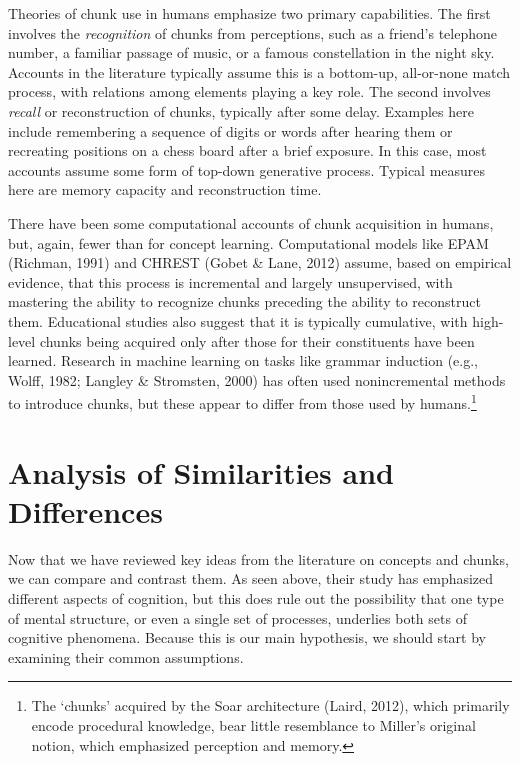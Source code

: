 \documentclass[11pt,letterpaper]{article}
\begin{document}
Theories of chunk use in humans emphasize two primary capabilities. 
The first involves the {\it recognition\/} of chunks from perceptions, 
  such as a friend's telephone number, a familiar passage of music,
  or a famous constellation in the night sky. 
Accounts in the literature typically assume this is a bottom-up,
  all-or-none match process, with relations among elements playing 
  a key role. 
The second involves {\it recall\/} or reconstruction of chunks, typically 
  after some delay. 
Examples here include remembering a sequence of digits or words after 
  hearing them or recreating positions on a chess board after a brief 
  exposure. 
In this case, most accounts assume some form of top-down generative
  process. 
Typical measures here are memory capacity and reconstruction time. 




There have been some computational accounts of chunk acquisition
  in humans, but, again, fewer than for concept learning. 
Computational models like EPAM (Richman, 1991) and CHREST (Gobet \& 
  Lane, 2012) assume, based on empirical evidence, that this process 
  is incremental and largely unsupervised, with mastering the ability 
  to recognize chunks preceding the ability to reconstruct them. 
Educational studies also suggest that it is typically cumulative, 
  with high-level chunks being acquired only after those for their 
  constituents have been learned.  
Research in machine learning on tasks like grammar induction 
  (e.g., Wolff, 1982; Langley \& Stromsten, 2000) has often used 
  nonincremental methods to introduce chunks, but these appear 
  to differ from those used by humans.\footnote{The `chunks' acquired 
  by the Soar architecture (Laird, 2012), which primarily encode 
  procedural knowledge, bear little resemblance to Miller's original 
  notion, which emphasized perception and memory.} 

\newpage

\section{Analysis of Similarities and Differences} 

Now that we have reviewed key ideas from the literature on concepts and
chunks, we can compare and contrast them. As seen above, their study
has emphasized different aspects of cognition, but this does rule out 
the possibility that one type of mental structure, or even a single 
set of processes, underlies both sets of cognitive phenomena. Because
this is our main hypothesis, we should start by examining their common
assumptions. 
\end{document}
